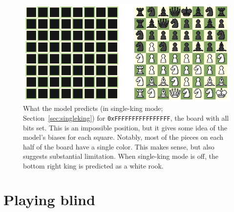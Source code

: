 \documentclass[twocolumn]{amsart}
\begin{document}
\begin{figure}[ht]
\includegraphics[width=0.9 \linewidth]{blind-allon}
\caption{What the model predicts (in single-king mode;
  Section~\ref{sec:singleking}) for {\tt 0xFFFFFFFFFFFFFFFF}, the board
  with all bits set. This is an impossible position, but it gives some
  idea of the model's biases for each square. Notably, most of the pieces
  on each half of the board have a single color. This makes sense, but
  also suggests substantial limitation. When single-king mode is off,
  the bottom right king is predicted as a white rook.} \label{fig:allon}
\end{figure}

\section{Playing blind}
\end{document}
